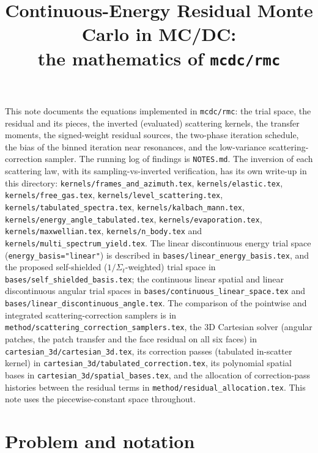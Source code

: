 \documentclass[11pt]{article}
\title{Continuous-Energy Residual Monte Carlo in MC/DC:\\
the mathematics of \texttt{mcdc/rmc}}
\date{}
\begin{document}
\maketitle

\noindent This note documents the equations implemented in \texttt{mcdc/rmc}: the
trial space, the residual and its pieces, the inverted (evaluated) scattering kernels,
the transfer moments, the signed-weight residual sources, the two-phase iteration
schedule, the bias of the binned iteration near resonances, and the low-variance
scattering-correction sampler. The running log of findings is \texttt{NOTES.md}.
The inversion of each scattering law, with its sampling-vs-inverted verification, has
its own write-up in this directory: \texttt{kernels/frames\_and\_azimuth.tex},
\texttt{kernels/elastic.tex}, \texttt{kernels/free\_gas.tex}, \texttt{kernels/level\_scattering.tex},
\texttt{kernels/tabulated\_spectra.tex}, \texttt{kernels/kalbach\_mann.tex},
\texttt{kernels/energy\_angle\_tabulated.tex}, \texttt{kernels/evaporation.tex},
\texttt{kernels/maxwellian.tex}, \texttt{kernels/n\_body.tex} and \texttt{kernels/multi\_spectrum\_yield.tex}.
The linear discontinuous energy trial space (\texttt{energy\_basis="linear"}) is
described in \texttt{bases/linear\_energy\_basis.tex}, and the proposed self-shielded
($1/\Sigma_t$-weighted) trial space in \texttt{bases/self\_shielded\_basis.tex}; the
continuous linear spatial and linear discontinuous angular trial spaces in
\texttt{bases/continuous\_linear\_space.tex} and \texttt{bases/linear\_discontinuous\_angle.tex}.
The comparison of the pointwise and integrated scattering-correction samplers is in
\texttt{method/scattering\_correction\_samplers.tex}, the 3D Cartesian solver (angular
patches, the patch transfer and the face residual on all six faces) in
\texttt{cartesian\_3d/cartesian\_3d.tex}, its correction passes (tabulated in-scatter
kernel) in \texttt{cartesian\_3d/tabulated\_correction.tex}, its polynomial spatial
bases in \texttt{cartesian\_3d/spatial\_bases.tex}, and the allocation of
correction-pass histories between the residual terms in
\texttt{method/residual\_allocation.tex}.
This note uses the piecewise-constant space throughout.

\tableofcontents

\section{Problem and notation}
\end{document}
